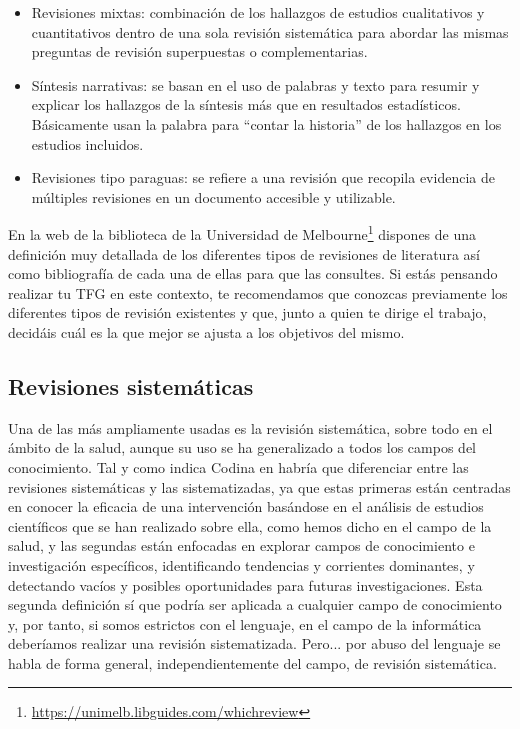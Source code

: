 \begin{itemize}
\begin{itemize}
        \item Revisiones mixtas: combinación de los hallazgos de estudios cualitativos y cuantitativos dentro de una sola revisión sistemática para abordar las mismas preguntas de revisión superpuestas o complementarias.
        
        \item Síntesis narrativas: se basan en el uso de palabras y texto para resumir y explicar los hallazgos de la síntesis más que en resultados estadísticos. Básicamente usan la palabra para ``contar la historia'' de los hallazgos en los estudios incluidos.

        \item Revisiones tipo paraguas: se refiere a una revisión que recopila evidencia de múltiples revisiones en un documento accesible y utilizable. 
        
    \end{itemize}
\end{itemize}

En la web de la {biblioteca de la Universidad de Melbourne}\footnote{\url{https://unimelb.libguides.com/whichreview}} dispones de una definición muy detallada de los diferentes tipos de revisiones de literatura así como bibliografía de cada una de ellas para que las consultes. Si estás pensando realizar tu TFG en este contexto, te recomendamos que conozcas previamente los diferentes tipos de revisión existentes y que, junto a quien te dirige el trabajo, decidáis cuál es la que mejor se ajusta a los objetivos del mismo.

\subsection{Revisiones sistemáticas}

Una de las más ampliamente usadas es la revisión sistemática, sobre todo en el ámbito de la salud, aunque su uso se ha generalizado a todos los campos del conocimiento. Tal y como indica Codina en \cite{codina2018lluis} habría que diferenciar entre las revisiones sistemáticas y las sistematizadas, ya que estas primeras están centradas en conocer la eficacia de una intervención basándose en el análisis de estudios científicos que se han realizado sobre ella, como hemos dicho en el campo de la salud, y las segundas están enfocadas en explorar campos de conocimiento e investigación específicos, identificando  tendencias y corrientes dominantes, y detectando vacíos y posibles oportunidades para futuras investigaciones. Esta segunda definición sí que podría ser aplicada a cualquier campo de conocimiento y, por tanto, si somos estrictos con el lenguaje, en el campo de la informática deberíamos realizar una revisión sistematizada. Pero... por abuso del lenguaje se habla de forma general, independientemente del campo, de revisión sistemática. 

